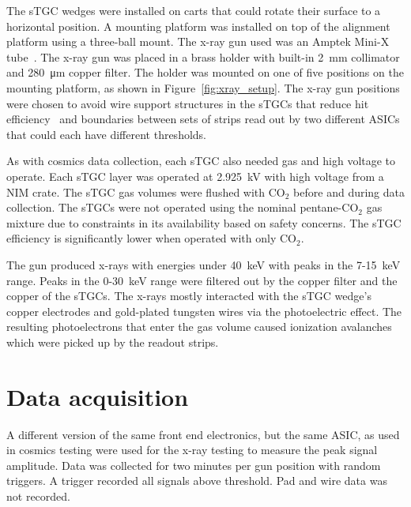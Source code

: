 The sTGC wedges were installed on carts that could rotate their surface to a horizontal position. A mounting platform was installed on top of the alignment platform using a three-ball mount. The x-ray gun used was an Amptek Mini-X tube~\cite{xray_gun}. The x-ray gun was placed in a brass holder with built-in \SI{2}{mm} collimator and \SI{280}{\micro\meter} copper filter. The holder was mounted on one of five positions on the mounting platform, as shown in Figure~\ref{fig:xray_setup}. The x-ray gun positions were chosen to avoid wire support structures in the sTGCs that reduce hit efficiency~\cite{lefebvre_thesis} and boundaries between sets of strips read out by two different ASICs that could each have different thresholds. 

As with cosmics data collection, each sTGC also needed gas and high voltage to operate. Each sTGC layer was operated at \SI{2.925}{kV} with high voltage from a NIM crate. The sTGC gas volumes were flushed with CO$_2$ before and during data collection. The sTGCs were not operated using the nominal pentane-CO$_2$ gas mixture due to constraints in its availability based on safety concerns. The sTGC efficiency is significantly lower when operated with only CO$_2$.

The gun produced x-rays with energies under \SI{40}{\kilo\electronvolt} with peaks in the 7-\SI{15}{keV} range. Peaks in the 0-\SI{30}{keV} range were filtered out by the copper filter and the copper of the sTGCs. The x-rays mostly interacted with the sTGC wedge's copper electrodes and gold-plated tungsten wires via the photoelectric effect. The resulting photoelectrons that enter the gas volume caused ionization avalanches which were picked up by the readout strips.

\section{Data acquisition}

A different version of the same front end electronics, but the same ASIC, as used in cosmics testing were used for the x-ray testing to measure the peak signal amplitude. Data was collected for two minutes per gun position with random triggers. A trigger recorded all signals above threshold. Pad and wire data was not recorded.

